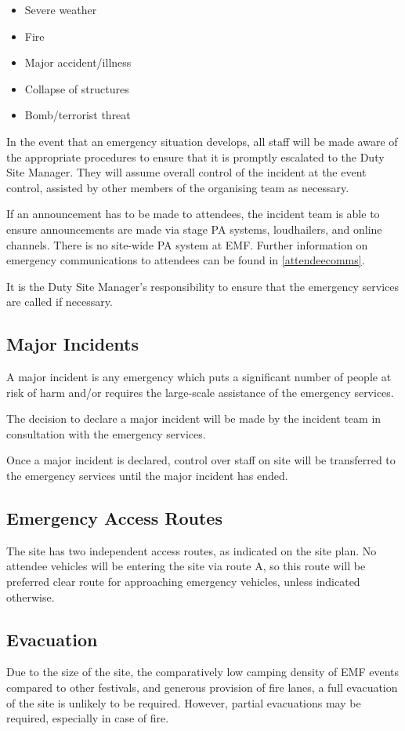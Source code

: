 \begin{itemize}
    \tightlist
    \item Severe weather
    \item Fire
    \item Major accident/illness
    \item Collapse of structures
    \item Bomb/terrorist threat
\end{itemize}

In the event that an emergency situation develops, all staff will be made aware of
the appropriate procedures to ensure that it is promptly escalated to the Duty Site Manager.
They will assume overall control of the incident at the event control, assisted by other
members of the organising team as necessary.

If an announcement has to be made to attendees, the incident team is able to
ensure announcements are made via stage PA systems, loudhailers, and online channels.
There is no site-wide PA system at EMF\@. Further information on emergency communications
to attendees can be found in \cref{attendeecomms}.

It is the Duty Site Manager's responsibility to ensure that the emergency services
are called if necessary.

\subsection{Major Incidents}
A major incident is any emergency which puts a significant number of people at risk
of harm and/or requires the large-scale assistance of the emergency services.

The decision to declare a major incident will be made by the incident team in
consultation with the emergency services.

Once a major incident is declared, control over staff on site will be transferred
to the emergency services until the major incident has ended.

\subsection{Emergency Access Routes}\label{emergencyaccess}
The site has two independent access routes, as indicated on the site plan. No
attendee vehicles will be entering the site via route A, so this route will be
preferred clear route for approaching emergency vehicles, unless indicated
otherwise.

\subsection{Evacuation}\label{evacuation}
Due to the size of the site, the comparatively low camping density of EMF events
compared to other festivals, and generous provision of fire lanes, a full evacuation
of the site is unlikely to be required. However, partial evacuations may be required,
especially in case of fire.

